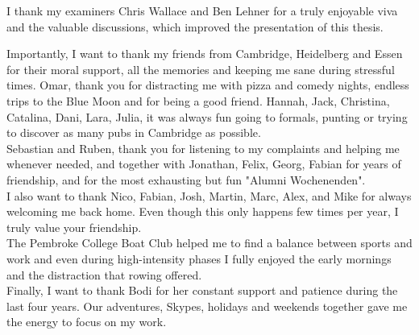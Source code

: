 \begin{acknowledgements}
I thank my examiners Chris Wallace and Ben Lehner for a truly enjoyable viva and the valuable discussions, which improved the presentation of this thesis.

\newpage
\thispagestyle{empty}
 
Importantly, I want to thank my friends from Cambridge, Heidelberg and Essen for their moral support, all the memories and keeping me sane during stressful times. 
Omar, thank you for distracting me with pizza and comedy nights, endless trips to the Blue Moon and for being a good friend. 
Hannah, Jack, Christina, Catalina, Dani, Lara, Julia, it was always fun going to formals, punting or trying to discover as many pubs in Cambridge as possible.\\

Sebastian and Ruben, thank you for listening to my complaints and helping me whenever needed, and together with Jonathan, Felix, Georg, Fabian for years of friendship, and for the most exhausting but fun "Alumni Wochenenden".  \\

I also want to thank Nico, Fabian, Josh, Martin, Marc, Alex, and Mike for always welcoming me back home. 
Even though this only happens few times per year, I truly value your friendship. \\

The Pembroke College Boat Club helped me to find a balance between sports and work and even during high-intensity phases I fully enjoyed the early mornings and the distraction that rowing offered. \\

Finally, I want to thank Bodi for her constant support and patience during the last four years. 
Our adventures, Skypes, holidays and weekends together gave me the energy to focus on my work.

\end{acknowledgements}

